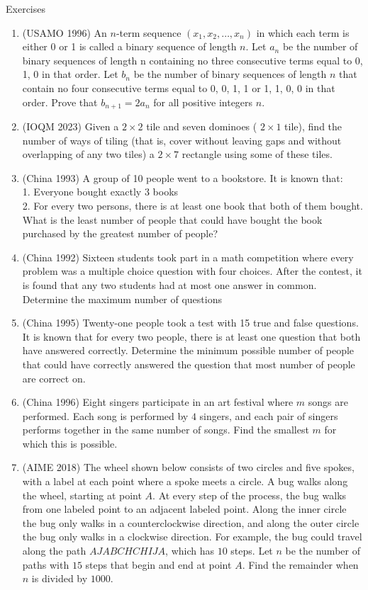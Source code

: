 \begin{xcb}{Exercises}
\begin{enumerate}
\item (USAMO 1996) An $n$-term sequence $(x_1, x_2, \ldots, x_n)$ in which each term is either 0 or 1 is called a binary sequence of length $n$. Let $a_n$ be the number of binary sequences of length n containing no three consecutive terms equal to 0, 1, 0 in that order. Let $b_n$ be the number of binary sequences of length $n$ that contain no four consecutive terms equal to 0, 0, 1, 1 or 1, 1, 0, 0 in that order. Prove that $b_{n+1} = 2a_n$ for all positive integers $n$.
\item (IOQM 2023) Given a $2 \times 2$ tile and seven dominoes ( $2 \times 1$ tile), find the number of ways of tiling (that is, cover without leaving gaps and without overlapping of any two tiles) a $2 \times 7$ rectangle using some of these tiles.
\item (China 1993) A group of 10 people went to a bookstore. It is known that:\\
1. Everyone bought exactly 3 books\\
2. For every two persons, there is at least one book that both of them bought.\\
What is the least number of people that could have bought the book purchased by the greatest number of people?\\
\item (China 1992) Sixteen students took part in a math competition where every problem was a multiple choice question with four choices. After the contest, it is found that any two students had at most one answer in common. Determine the maximum number of questions
\item  (China 1995) Twenty-one people took a test with 15 true and false questions. It is known that for every two people, there is at least one question that both have answered correctly. Determine the minimum possible number of people that could have correctly answered the question that most number of people are correct on.
\item (China 1996) Eight singers participate in an art festival where $m$ songs are performed. Each song is performed by $4$ singers, and each pair of singers performs together in the same number of songs. Find the smallest $m$ for which this is possible.
\item (AIME 2018) The wheel shown below consists of two circles and five spokes, with a label at each point where a spoke meets a circle. A bug walks along the wheel, starting at point $A$. At every step of the process, the bug walks from one labeled point to an adjacent labeled point. Along the inner circle the bug only walks in a counterclockwise direction, and along the outer circle the bug only walks in a clockwise direction. For example, the bug could travel along the path $AJABCHCHIJA$, which has $10$ steps. Let $n$ be the number of paths with $15$ steps that begin and end at point $A$. Find the remainder when $n$ is divided by $1000.$

\end{enumerate}
\end{xcb}
